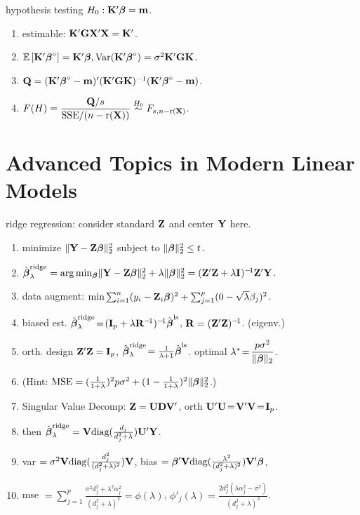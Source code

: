 hypothesis testing $H_0: \mathbf{K}' \boldsymbol{\beta} = \mathbf{m}$. \begin{enumerate}
    \item estimable: $\mathbf{K}'\mathbf{G}\mathbf{X}'\mathbf{X} = \mathbf{K}'$.
    \item $\mathbb{E}\left[ \mathbf{K}'\boldsymbol{\beta}^\circ \right] = \mathbf{K}'\boldsymbol{\beta}, \text{Var}(\mathbf{K}'\boldsymbol{\beta}^\circ) = \sigma^2 \mathbf{K}' \mathbf{G} \mathbf{K}$.
    \item $\mathbf{Q} = (\mathbf{K}'\boldsymbol{\beta}^\circ - \mathbf{m})' (\mathbf{K}'\mathbf{G}\mathbf{K})^{-1} (\mathbf{K}'\boldsymbol{\beta}^\circ - \mathbf{m})$.
    \item $F(H) = \dfrac{\mathbf{Q} / s}{\text{SSE} / (n - \text{r}(\mathbf{X}))} \stackrel{H_0}{\sim} F_{s, n-\text{r}(\mathbf{X})}$.
\end{enumerate}
    

\newcol

\section*{Advanced Topics in Modern Linear Models}

ridge regression: consider standard $\mathbf{Z}$ and center $\mathbf{Y}$ here.
    \begin{enumerate}[leftmargin = 2em]
    \item minimize $\lVert \mathbf{Y} - \mathbf{Z}\boldsymbol{\beta} \rVert_2^2$ subject to $\lVert \boldsymbol{\beta} \rVert_2^2 \leq t$.
    \item $\hat{\boldsymbol{\beta}}^{\text{ridge}}_\lambda = \arg \min_{\boldsymbol{\beta}} \lVert \mathbf{Y} - \mathbf{Z}\boldsymbol{\beta} \rVert_2^2 + \lambda \lVert \boldsymbol{\beta} \rVert_2^2 = (\mathbf{Z}'\mathbf{Z} + \lambda \mathbf{I}_{})^{-\!1} \mathbf{Z}'\mathbf{Y}$.
    \item data augment: $\min \sum_{i=1}^n (y_i - \mathbf{Z}_i \boldsymbol{\beta})^2 + \sum_{j=1}^p (0 - \sqrt{\lambda} \beta_j)^2$.
    \item biased est. $\hat{\boldsymbol{\beta}}^{\text{ridge}}_\lambda \!=\! (\mathbf{I}_{p} + \lambda \mathbf{R}^{-\!1})^{-\!1} \hat{\boldsymbol{\beta}}^{\text{ls}}$, $\mathbf{R} = (\mathbf{Z}'\mathbf{Z})^{-\!1}$. (eigenv.)
    \item orth. design $\mathbf{Z}'\mathbf{Z} = \mathbf{I}_{p}$, $\hat{\boldsymbol{\beta}}^{\text{ridge}}_\lambda \! = \frac{1}{\lambda + 1} \hat{\boldsymbol{\beta}}^{\text{ls}}$. optimal $\lambda^* \!=\! \dfrac{p \sigma^2}{\lVert \boldsymbol{\beta} \rVert_2}$.
    \item [] \vspace{-1ex} (Hint: $\text{MSE} = (\frac{1}{1+\lambda})^2 p \sigma^2 + (1 - \frac{1}{1+\lambda})^2 \lVert \boldsymbol{\beta} \rVert_2^2$.) 
    \item Singular Value Decomp: $\mathbf{Z} = \mathbf{U} \mathbf{D} \mathbf{V}'$, orth $\mathbf{U}'\mathbf{U} \!=\! \mathbf{V}'\mathbf{V} \!=\! \mathbf{I}_{p}$. 
    \item [] then $\hat{\boldsymbol{\beta}}^{\text{ridge}}_\lambda = \mathbf{V} \text{diag}( \frac{d_j}{d_j^2 + \lambda} ) \mathbf{U}' \mathbf{Y}$.
    \item [] \vspace{-1ex} var $= \sigma^2 \mathbf{V} \text{diag}( \frac{d_j^2}{(d_j^2 + \lambda)^2} ) \mathbf{V}$, 
        bias $= \boldsymbol{\beta}' \mathbf{V} \text{diag}( \frac{\lambda^2}{(d_j^2 + \lambda)^2} ) \mathbf{V}' \boldsymbol{\beta}$,
    \item [] \vspace{-1ex} mse $= \sum_{j=1}^p \frac{\sigma^2 d_j^2 + \lambda^2 \alpha_j^2 }{(d_j^2 + \lambda)^2} = \phi(\lambda)$, $\phi'_j(\lambda) = \frac{2 d_j^2 (\lambda\alpha_j^2 - \sigma^2)}{(d_j^2 + \lambda)^3}$.
\end{enumerate}

